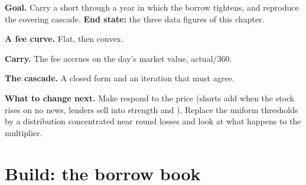 \begin{tutorial}
\textbf{Goal.} Carry a short through a year in which the borrow tightens, and
reproduce the covering cascade. \textbf{End state:} the three data figures of
this chapter.
\begin{tutsteps}
\item \textbf{A fee curve.} Flat, then convex.
\label{lst:m1:stock-loan-and-short-selling:fee}
\item \textbf{Carry.} The fee accrues on the day's market value, actual/360.
\label{lst:m1:stock-loan-and-short-selling:carry}
\item \textbf{The cascade.} A closed form and an iteration that must agree.
\label{lst:m1:stock-loan-and-short-selling:squeeze}
\end{tutsteps}
\textbf{What to change next.} Make  respond to the price (shorts
add when the stock rises on no news, lenders sell into strength and ).
Replace the uniform thresholds by a distribution concentrated near round
losses and look at what happens to the multiplier.
\end{tutorial}

\section{Build: the borrow book}\label{bld:m1:stock-loan-and-short-selling:borrow}

